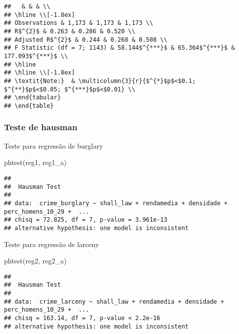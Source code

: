 \documentclass[
]{article}
\newenvironment{Shaded}{\begin{snugshade}}{\end{snugshade}}
\newcommand{\FunctionTok}[1]{\textcolor[rgb]{0.00,0.00,0.00}{#1}}
\newcommand{\NormalTok}[1]{#1}
\begin{document}
\begin{verbatim}
##   & & & \\ 
## \hline \\[-1.8ex] 
## Observations & 1,173 & 1,173 & 1,173 \\ 
## R$^{2}$ & 0.263 & 0.286 & 0.520 \\ 
## Adjusted R$^{2}$ & 0.244 & 0.268 & 0.508 \\ 
## F Statistic (df = 7; 1143) & 58.144$^{***}$ & 65.364$^{***}$ & 177.093$^{***}$ \\ 
## \hline 
## \hline \\[-1.8ex] 
## \textit{Note:}  & \multicolumn{3}{r}{$^{*}$p$<$0.1; $^{**}$p$<$0.05; $^{***}$p$<$0.01} \\ 
## \end{tabular} 
## \end{table}
\end{verbatim}

\hypertarget{teste-de-hausman}{%
\subsubsection{Teste de hausman}\label{teste-de-hausman}}

Teste para regressão de burglary

\begin{Shaded}
\begin{Highlighting}[]
\FunctionTok{phtest}\NormalTok{(reg1, reg1\_a) }
\end{Highlighting}
\end{Shaded}

\begin{verbatim}
## 
##  Hausman Test
## 
## data:  crime_burglary ~ shall_law + rendamedia + densidade + perc_homens_10_29 +  ...
## chisq = 72.825, df = 7, p-value = 3.961e-13
## alternative hypothesis: one model is inconsistent
\end{verbatim}

Teste para regressão de larceny

\begin{Shaded}
\begin{Highlighting}[]
\FunctionTok{phtest}\NormalTok{(reg2, reg2\_a) }
\end{Highlighting}
\end{Shaded}

\begin{verbatim}
## 
##  Hausman Test
## 
## data:  crime_larceny ~ shall_law + rendamedia + densidade + perc_homens_10_29 +  ...
## chisq = 163.14, df = 7, p-value < 2.2e-16
## alternative hypothesis: one model is inconsistent
\end{verbatim}
\end{document}
